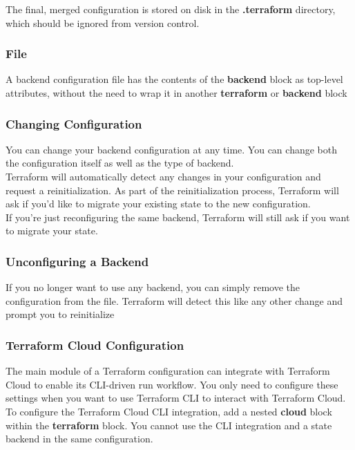 \documentclass[12pt, letterpaper, twoside]{article}
\begin{document}
The final, merged configuration is stored on disk in the \textbf{.terraform} directory, which should 
be ignored from version control.

\subsubsection{File}
A backend configuration file has the contents of the \textbf{backend} block as top-level attributes, without 
the need to wrap it in another \textbf{terraform} or \textbf{backend} block

\subsubsection{Changing Configuration}
You can change your backend configuration at any time. You can change both the configuration itself as 
well as the type of backend.\\
Terraform will automatically detect any changes in your configuration and request a reinitialization. 
As part of the reinitialization process, Terraform will ask if you'd like to migrate your existing state to 
the new configuration.\\

If you're just reconfiguring the same backend, Terraform will still ask if you want to migrate your state.

\subsubsection{Unconfiguring a Backend}
If you no longer want to use any backend, you can simply remove the configuration from the file. 
Terraform will detect this like any other change and prompt you to reinitialize

\subsubsection{Terraform Cloud Configuration}
The main module of a Terraform configuration can integrate with Terraform Cloud to enable its CLI-driven 
run workflow. You only need to configure these settings when you want to use Terraform CLI to interact 
with Terraform Cloud.\\

To configure the Terraform Cloud CLI integration, add a nested \textbf{cloud} block within the \textbf{terraform} block. 
You cannot use the CLI integration and a state backend in the same configuration.
\end{document}
